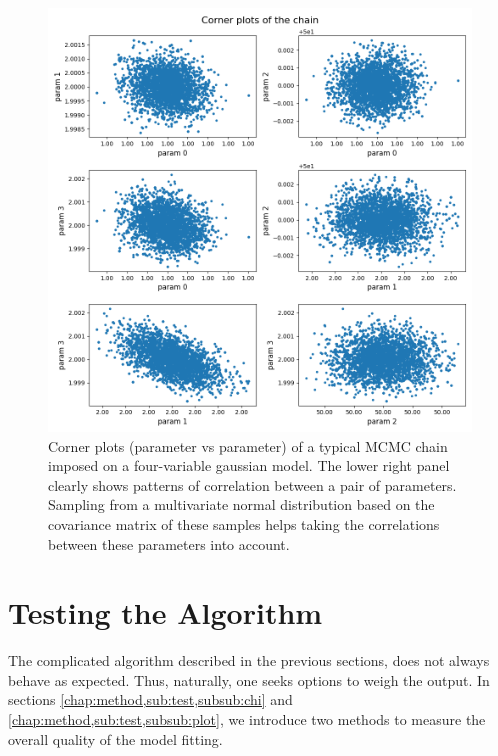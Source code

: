 \documentclass[12pt, TexShade, letterpaper]{report}
\begin{document}
\begin{figure}[h!]
\centering
\includegraphics[scale =0.6]{corner_plot_chain.png}
\caption[Corner plots of an MCMC chain]{Corner plots (parameter vs parameter) of a typical MCMC chain imposed on a four-variable gaussian model. The lower right panel clearly shows patterns of correlation between a pair of parameters. Sampling from a multivariate normal distribution based on the covariance matrix of these samples helps taking the correlations between these parameters into account.}
\label{fig:corner_plots}
\end{figure}

\section{Testing the Algorithm}
The complicated algorithm described in the previous sections, does not always behave as expected. Thus, naturally, one seeks options to weigh the output. In sections \ref{chap:method,sub:test,subsub:chi} and \ref{chap:method,sub:test,subsub:plot}, we introduce two methods to measure the overall quality of the model fitting.\par
\end{document}
